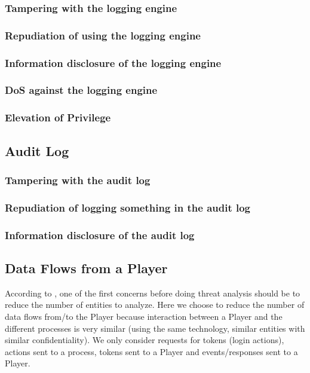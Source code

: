 \documentclass[a4paper,11pt]{report}
\begin{document}
\subsubsection{Tampering with the logging engine}
\subsubsection{Repudiation of using the logging engine}
\subsubsection{Information disclosure of the logging engine}
\subsubsection{DoS against the logging engine}
\subsubsection{Elevation of Privilege}
\subsection{Audit Log}
\subsubsection{Tampering with the audit log}
\subsubsection{Repudiation of logging something in the audit log}
\subsubsection{Information disclosure of the audit log}

\subsection{Data Flows from a Player}

According to \cite[p117]{1202957}, one of the first concerns before doing threat analysis should be to reduce the number of entities to analyze.
Here we choose to reduce the number of data flows from/to the Player because interaction between a Player and the different processes is very similar (using the same technology, similar entities with similar confidentiality). We only consider requests for tokens (login actions), actions sent to a process, tokens sent to a Player and events/responses sent to a Player.
\end{document}
